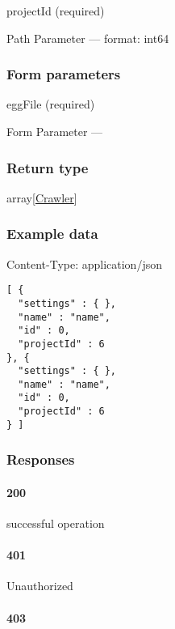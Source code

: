 projectId (required)

{Path Parameter} --- format: int64

\hypertarget{form-parameters}{%
\subsubsection*{Form parameters}\label{form-parameters}}

eggFile (required)

{Form Parameter} ---

\hypertarget{return-type-19}{%
\subsubsection*{Return type}\label{return-type-19}}

array{[}\protect\hyperlink{Crawler}{Crawler}{]}

\hypertarget{example-data-19}{%
\subsubsection*{Example data}\label{example-data-19}}

Content-Type: application/json

\begin{verbatim}
[ {
  "settings" : { },
  "name" : "name",
  "id" : 0,
  "projectId" : 6
}, {
  "settings" : { },
  "name" : "name",
  "id" : 0,
  "projectId" : 6
} ]
\end{verbatim}

\hypertarget{responses-19}{%
\subsubsection*{Responses}\label{responses-19}}

\hypertarget{section-67}{%
\paragraph{200}\label{section-67}}

successful operation

\hypertarget{section-68}{%
\paragraph{401}\label{section-68}}

Unauthorized \protect\hyperlink{}{}

\hypertarget{section-69}{%
\paragraph{403}\label{section-69}}

